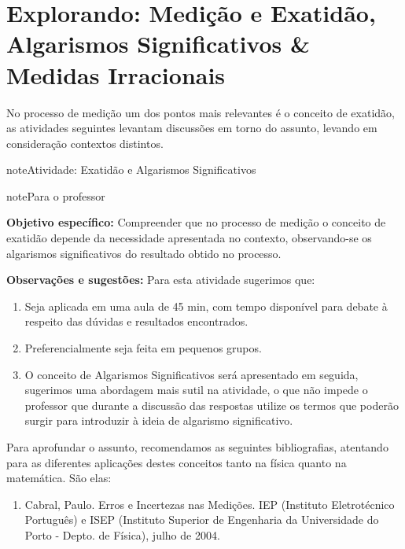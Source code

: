 \section{Explorando: Medição e Exatidão, Algarismos Significativos \& Medidas Irracionais}
\label{\detokenize{NO103-5:explorando-medicao-e-exatidao-algarismos-significativos-medidas-irracionais}}\label{\detokenize{NO103-5::doc}}
No processo de medição um dos pontos mais relevantes é o conceito de exatidão, as atividades seguintes levantam discussões em torno do assunto, levando em consideração contextos distintos.
\label{\detokenize{NO103-5:sub-ativ-algsig}}
\begin{sphinxadmonition}{note}{Atividade: Exatidão e Algarismos Significativos}

\begin{sphinxadmonition}{note}{Para o professor}

\textbf{Objetivo específico:} Compreender que no processo de medição o conceito de exatidão depende da necessidade apresentada no contexto, observando-se os algarismos significativos do resultado obtido no processo.

\textbf{Observações e sugestões:}
Para esta atividade sugerimos que:
\begin{enumerate}
\item {} 
Seja aplicada em uma aula de 45 min, com tempo disponível para debate à respeito das dúvidas e resultados encontrados.

\item {} 
Preferencialmente seja feita em pequenos grupos.

\item {} 
O conceito de Algarismos Significativos será apresentado em seguida, sugerimos uma abordagem mais sutil na atividade, o que não impede o professor que durante a discussão das respostas utilize os termos que poderão surgir para introduzir à ideia de algarismo significativo.

\end{enumerate}

Para aprofundar o assunto, recomendamos as seguintes bibliografias, atentando para as diferentes aplicações destes conceitos tanto na física quanto na matemática. São elas:
\begin{enumerate}
\item {} 
Cabral, Paulo. Erros e Incertezas nas Medições. IEP (Instituto Eletrotécnico Português) e ISEP (Instituto Superior de Engenharia da Universidade do Porto - Depto. de Física), julho de 2004.


\end{enumerate}
\end{sphinxadmonition}
\end{sphinxadmonition}
